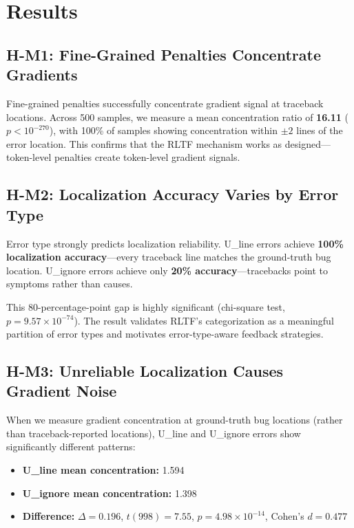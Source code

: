 \section{Results}

\subsection{H-M1: Fine-Grained Penalties Concentrate Gradients}

Fine-grained penalties successfully concentrate gradient signal at traceback locations. Across 500 samples, we measure a mean concentration ratio of \textbf{16.11} ($p<10^{-270}$), with 100\% of samples showing concentration within $\pm2$ lines of the error location. This confirms that the RLTF mechanism works as designed---token-level penalties create token-level gradient signals.

\subsection{H-M2: Localization Accuracy Varies by Error Type}

Error type strongly predicts localization reliability. U\_line errors achieve \textbf{100\% localization accuracy}---every traceback line matches the ground-truth bug location. U\_ignore errors achieve only \textbf{20\% accuracy}---tracebacks point to symptoms rather than causes.

This 80-percentage-point gap is highly significant (chi-square test, $p=9.57\times10^{-74}$). The result validates RLTF's categorization as a meaningful partition of error types and motivates error-type-aware feedback strategies.

\subsection{H-M3: Unreliable Localization Causes Gradient Noise}

When we measure gradient concentration at ground-truth bug locations (rather than traceback-reported locations), U\_line and U\_ignore errors show significantly different patterns:
\begin{itemize}
\item \textbf{U\_line mean concentration:} 1.594
\item \textbf{U\_ignore mean concentration:} 1.398
\item \textbf{Difference:} $\Delta=0.196$, $t(998)=7.55$, $p=4.98\times10^{-14}$, Cohen's $d=0.477$
\end{itemize}

